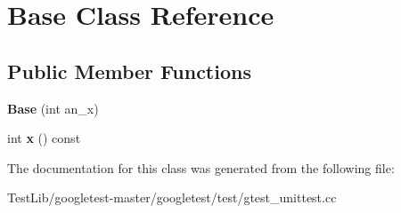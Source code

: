 \hypertarget{classBase}{}\section{Base Class Reference}
\label{classBase}
\subsection*{Public Member Functions}
\begin{DoxyCompactItemize}
\item 
\mbox{\label{classBase_a1d5f3fb92f8cbc687705785bdc6abd18}} 
{\bfseries Base} (int an\+\_\+x)
\item 
\mbox{\label{classBase_a779fd2b157ebd763b15383d96047e07c}} 
int {\bfseries x} () const
\end{DoxyCompactItemize}


The documentation for this class was generated from the following file\+:\begin{DoxyCompactItemize}
\item 
Test\+Lib/googletest-\/master/googletest/test/gtest\+\_\+unittest.\+cc\end{DoxyCompactItemize}
